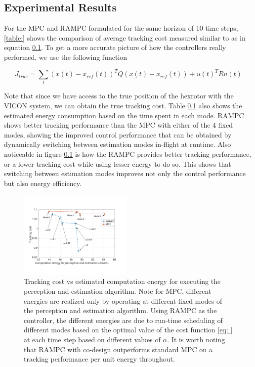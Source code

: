 \subsection{Experimental Results}

For the MPC and RAMPC formulated for the same horizon of 10 time steps, \ref{table:} shows the comparison of average tracking cost measured similar to as in equation \ref{}. To get a more accurate picture of how the controllers really performed, we use the following function 

\small{
\begin{equation}
J_{true} = \sum_t (x(t)-x_{ref}(t))^{T}Q(x(t)-x_{ref}(t)) + u(t)^{T}Ru(t)
\end{equation}}

Note that since we have access to the true position of the hexrotor with the VICON system, we can obtain the true tracking cost. Table \ref{} also shows the estimated energy consumption based on the time spent in each mode. RAMPC shows better tracking performance than the MPC with either of the 4 fixed modes, showing the improved control performance that can be obtained by dynamically switching between estimation modes in-flight at runtime. Also noticeable in figure \ref{} is how the RAMPC provides better tracking performance, or a lower tracking cost while using lesser energy to do so. This shows that switching between estimation modes improves not only the control performance but also energy efficiency. 


\begin{figure}[t]
	\centering
	\includegraphics[width=0.49\textwidth,scale=0.7]{figures/TrackingVsEnergy}
        \vspace{-20pt}
	\caption{Tracking cost vs estimated computation energy for executing the perception and estimation algorithm. Note for MPC, different energies are realized only by operating at different fixed modes of the perception and estimation algorithm. Using RAMPC as the controller, the different energies are due to run-time scheduling of different modes based on the optimal value of the cost function \ref{eq: } at each time step based on different values of $\alpha$. It is worth noting that RAMPC with co-design outperforms standard MPC on a tracking performance per unit energy throughout.}
	\label{fig:modeSwitching}
\end{figure}




